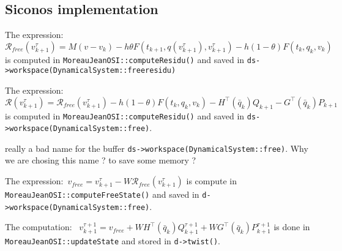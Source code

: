 \subsection{Siconos implementation}

The expression:~$\mathcal R_{free}(v^\tau_{k+1}) = M(v-v_k) - h  \theta F(t_{k+1}, q(v^\tau_{k+1}),v^\tau_{k+1}) - h (1- \theta) F(t_{k}, q_{k},v_{k})$ is computed in {\tt MoreauJeanOSI::computeResidu()} and saved in {\tt ds->workspace(DynamicalSystem::freeresidu)}


The expression:~$\mathcal R(v^\tau_{k+1}) =\mathcal R_{free}(v^\tau_{k+1}) - h (1- \theta) F(t_{k}, q_{k},v_{k}) - H^\top(\bar q_k) Q_{k+1} - G^\top(\bar q_k) P_{k+1}  $ is computed in {\tt MoreauJeanOSI::computeResidu()} and saved in {\tt ds->workspace(DynamicalSystem::free)}.
\begin{ndrva}
  really a bad name for the buffer {\tt ds->workspace(DynamicalSystem::free)}. Why we are chosing this name ? to save some memory ?
\end{ndrva}


The expression:~$v_{free}  = v^{\tau}_{k+1} - W  \mathcal R_{free}(v^\tau_{k+1})$ is compute in {\tt MoreauJeanOSI::computeFreeState()} and saved in {\tt d->workspace(DynamicalSystem::free)}. 



The computation:~ $v^{\tau+1}_{k+1} = v_{free} + W   H^\top(\bar q_k) Q^{\tau+1}_{k+1} + W G^\top(\bar q_k) P^{\tau+1}_{k+1}$ is done in {\tt MoreauJeanOSI::updateState} and stored in {\tt d->twist()}.\\


